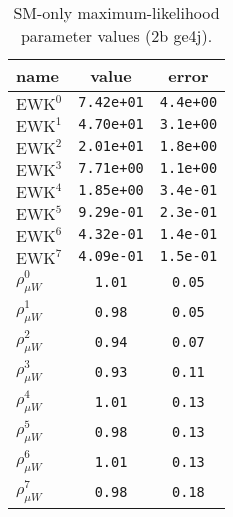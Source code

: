 %

\begin{table}\centering
\caption{SM-only maximum-likelihood parameter values (2b ge4j).}
\label{tab:mlParameterValues2b_ge4j}
\begin{tabular}{lcc}name & value & error \\ \hline
$\mathrm{EWK}^{0}$ & {\tt  7.42e+01} & {\tt  4.4e+00}\\
$\mathrm{EWK}^{1}$ & {\tt  4.70e+01} & {\tt  3.1e+00}\\
$\mathrm{EWK}^{2}$ & {\tt  2.01e+01} & {\tt  1.8e+00}\\
$\mathrm{EWK}^{3}$ & {\tt  7.71e+00} & {\tt  1.1e+00}\\
$\mathrm{EWK}^{4}$ & {\tt  1.85e+00} & {\tt  3.4e-01}\\
$\mathrm{EWK}^{5}$ & {\tt  9.29e-01} & {\tt  2.3e-01}\\
$\mathrm{EWK}^{6}$ & {\tt  4.32e-01} & {\tt  1.4e-01}\\
$\mathrm{EWK}^{7}$ & {\tt  4.09e-01} & {\tt  1.5e-01}\\
$\rho_{\mu W}^{0}$ & {\tt 1.01} & {\tt 0.05}\\
$\rho_{\mu W}^{1}$ & {\tt 0.98} & {\tt 0.05}\\
$\rho_{\mu W}^{2}$ & {\tt 0.94} & {\tt 0.07}\\
$\rho_{\mu W}^{3}$ & {\tt 0.93} & {\tt 0.11}\\
$\rho_{\mu W}^{4}$ & {\tt 1.01} & {\tt 0.13}\\
$\rho_{\mu W}^{5}$ & {\tt 0.98} & {\tt 0.13}\\
$\rho_{\mu W}^{6}$ & {\tt 1.01} & {\tt 0.13}\\
$\rho_{\mu W}^{7}$ & {\tt 0.98} & {\tt 0.18}\\
\hline
\end{tabular}
\end{table}
%
